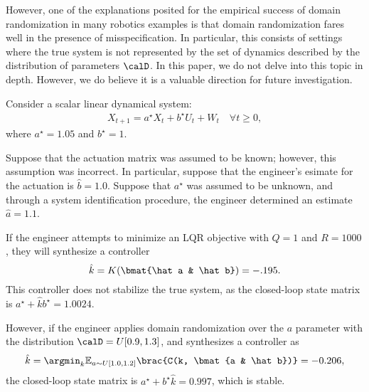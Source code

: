  However, one of the explanations posited for the empirical success of domain randomization in many robotics examples \citep{?} is that domain randomization fares well in the presence of misspecification. In particular, this consists of settings where the true system is not represented by the set of dynamics described by the distribution of parameters $\calD$. In this paper, we do not delve into this topic in depth. However, we do believe it is a valuable direction for future investigation. 

  Consider a scalar linear dynamical system:
     \begin{align*}
        X_{t+1} = a^\star X_t + b^\star U_t + W_t \quad \forall t\geq 0,
     \end{align*}
    where $a^\star = 1.05$ and $b^\star = 1$.  
    
    Suppose that the actuation matrix was assumed to be known; however, this assumption was incorrect. In particular, suppose that the engineer's esimate for the actuation is $\hat b = 1.0$. Suppose that $a^\star$ was assumed to be unknown, and through a system identification procedure, the engineer determined an estimate $\hat a = 1.1$. 
    
    If the engineer attempts to minimize an LQR objective with $Q=1$ and $R=1000$, they will synthesize a controller
    \[
        \hat k = K(\bmat{\hat a & \hat b}) = -.195.  
    \]
    This controller does not stabilize the true system, as the closed-loop state matrix is $a^\star + \hat k b^\star = 1.0024$. 
    
    However, if the engineer applies domain randomization over the $a$ parameter with the distribution $\calD = U[0.9, 1.3]$, and synthesizes a controller as 
    \[
        \hat k = \argmin_{k} \mathbb{E}_{a\sim U[1.0, 1.2]} \brac{C(k, \bmat{a & \hat b})} = -0.206,
    \]
    the closed-loop state matrix is $a^\star + b^\star \hat k = 0.997$, which is stable.  
    
 


